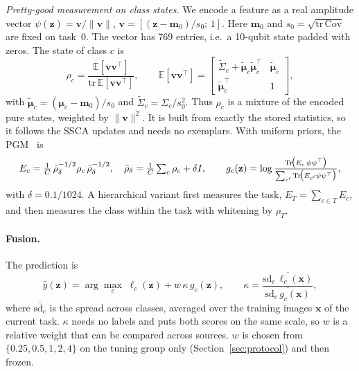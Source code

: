 \emph{Pretty-good measurement on class states.} We encode a feature as a
real amplitude vector
$\psi(\mathbf z)=\mathbf v/\|\mathbf v\|$, $\mathbf v=[(\mathbf z-\mathbf m_0)/s_0;\,1]$.
Here $\mathbf m_0$ and $s_0=\sqrt{\mathrm{tr}\,\mathrm{Cov}}$ are fixed on
task~0. The vector has 769 entries, i.e.\ a 10-qubit state padded with
zeros. The state of class $c$ is
\begin{equation}
  \rho_c=\frac{\mathbb E[\mathbf v\mathbf v^{\top}]}{\mathrm{tr}\,\mathbb E[\mathbf v\mathbf v^{\top}]},\qquad
  \mathbb E[\mathbf v\mathbf v^{\top}]=
  \begin{bmatrix}\tilde\Sigma_c+\tilde{\boldsymbol\mu}_c\tilde{\boldsymbol\mu}_c^{\top} & \tilde{\boldsymbol\mu}_c\\
  \tilde{\boldsymbol\mu}_c^{\top} & 1\end{bmatrix},
  \label{eq:state}
\end{equation}
with $\tilde{\boldsymbol\mu}_c=(\boldsymbol\mu_c-\mathbf m_0)/s_0$ and
$\tilde\Sigma_c=\Sigma_c/s_0^2$. Thus $\rho_c$ is a mixture of the encoded
pure states, weighted by $\|\mathbf v\|^2$. It is built from exactly the
stored statistics, so it follows the SSCA updates and needs no exemplars.
With uniform priors, the PGM~\cite{hausladen1994pgm} is
\begin{equation}
  E_c=\tfrac1C\,\bar\rho_\delta^{-1/2}\rho_c\,\bar\rho_\delta^{-1/2},\quad
  \bar\rho_\delta=\tfrac1C\textstyle\sum_c\rho_c+\delta I,\qquad
  g_c(\mathbf z)=\log\frac{\mathrm{Tr}\!\big(E_c\,\psi\psi^{\top}\big)}{\sum_{c'}\mathrm{Tr}\!\big(E_{c'}\psi\psi^{\top}\big)},
  \label{eq:pgm}
\end{equation}
with $\delta=0.1/1024$. A hierarchical variant first measures the task,
$E_T=\sum_{c\in T}E_c$, and then measures the class within the task with
whitening by $\rho_T$.

\paragraph{Fusion.}
The prediction is
\begin{equation}
  \hat y(\mathbf z)=\arg\max_c\;\ell_c(\mathbf z)+w\,\kappa\,g_c(\mathbf z),\qquad
  \kappa=\frac{\overline{\mathrm{sd}_c\,\ell_c(\mathbf x)}}{\overline{\mathrm{sd}_c\,g_c(\mathbf x)}},
  \label{eq:fusion}
\end{equation}
where $\overline{\mathrm{sd}_c}$ is the spread across classes, averaged over the
training images $\mathbf x$ of the current task. $\kappa$ needs no labels and
puts both scores on the same scale, so $w$ is a relative weight that can be
compared across sources. $w$ is chosen from $\{0.25,0.5,1,2,4\}$ on the tuning
group only (Section~\ref{sec:protocol}) and then frozen.

